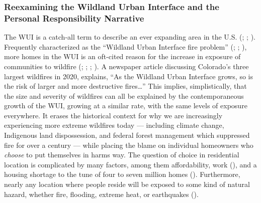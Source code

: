 \documentclass[
]{article}
\begin{document}
\subsubsection{Reexamining the Wildland Urban Interface and the Personal Responsibility Narrative}\label{reexamining-the-wildland-urban-interface-and-the-personal-responsibility-narrative}

The WUI is a catch-all term to describe an ever expanding area in the U.S. (; ; ). Frequently characterized as the ``Wildland Urban Interface fire problem'' (; ; ), more homes in the WUI is an oft-cited reason for the increase in exposure of communities to wildfire (; ; ; ). A newspaper article discussing Colorado's three largest wildfires in 2020, explains, ``As the Wildland Urban Interface grows, so is the risk of larger and more destructive fires\ldots{}'' This implies, simplistically, that the size and severity of wildfires can all be explained by the contemporaneous growth of the WUI, growing at a similar rate, with the same levels of exposure everywhere. It erases the historical context for why we are increasingly experiencing more extreme wildfires today --- including climate change, Indigenous land dispossession, and federal forest management which suppressed fire for over a century --- while placing the blame on individual homeowners who \emph{choose} to put themselves in harms way. The question of choice in residential location is complicated by many factors, among them affordability, work (), and a housing shortage to the tune of four to seven million homes (). Furthermore, nearly any location where people reside will be exposed to some kind of natural hazard, whether fire, flooding, extreme heat, or earthquakes ().
\end{document}
